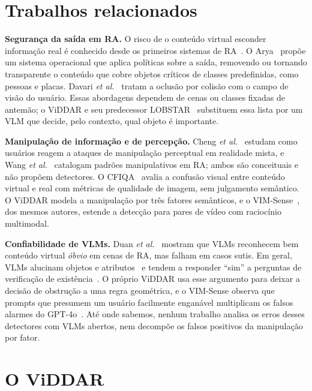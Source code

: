 \documentclass[journal,onecolumn]{IEEEtran}
\begin{document}
\section{Trabalhos relacionados}

\textbf{Segurança da saída em RA.} O risco de o conteúdo virtual esconder informação real é conhecido
desde os primeiros sistemas de RA~\cite{sabelman2015}. O Arya~\cite{lebeck2017,lebeck2018} propõe um
sistema operacional que aplica políticas sobre a saída, removendo ou tornando transparente o conteúdo
que cobre objetos críticos de classes predefinidas, como pessoas e placas. Davari
\emph{et al.}~\cite{davari2020} tratam a oclusão por colisão com o campo de visão do usuário. Essas
abordagens dependem de cenas ou classes fixadas de antemão; o ViDDAR e seu predecessor
LOBSTAR~\cite{lobstar} substituem essa lista por um VLM que decide, pelo contexto, qual objeto é
importante.

\textbf{Manipulação de informação e de percepção.} Cheng \emph{et al.}~\cite{cheng2023} estudam como
usuários reagem a ataques de manipulação perceptual em realidade mista, e Wang
\emph{et al.}~\cite{wang2024} catalogam padrões manipulativos em RA; ambos são conceituais e não
propõem detectores. O CFIQA~\cite{duan2022} avalia a confusão visual entre conteúdo virtual e real com
métricas de qualidade de imagem, sem julgamento semântico. O ViDDAR modela a manipulação por três
fatores semânticos, e o VIM-Sense~\cite{vimsense}, dos mesmos autores, estende a detecção para pares
de vídeo com raciocínio multimodal.

\textbf{Confiabilidade de VLMs.} Duan \emph{et al.}~\cite{duan2025} mostram que VLMs reconhecem bem
conteúdo virtual \emph{óbvio} em cenas de RA, mas falham em casos sutis. Em geral, VLMs alucinam
objetos e atributos~\cite{tong2024,guan2024} e tendem a responder ``sim'' a perguntas de verificação
de existência~\cite{pope2023}. O próprio ViDDAR usa esse argumento para deixar a decisão de obstrução
a uma regra geométrica, e o VIM-Sense observa que prompts que presumem um usuário facilmente enganável
multiplicam os falsos alarmes do GPT-4o~\cite{vimsense}. Até onde sabemos, nenhum trabalho analisa os
erros desses detectores com VLMs abertos, nem decompõe os falsos positivos da manipulação por fator.

\section{O ViDDAR}
\label{sec:viddar}
\end{document}
